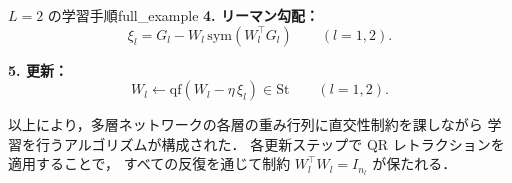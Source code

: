 \documentclass[uplatex, dvipdfmx]{jsarticle}
\begin{document}
\begin{example}{$L=2$ の学習手順}{full_example}
\textbf{4. リーマン勾配：}
\[
\xi_l = G_l - W_l\,\mathrm{sym}(W_l^\top G_l)
\qquad (l=1,2).
\]

\textbf{5. 更新：}
\[
W_l \gets \mathrm{qf}(W_l - \eta\,\xi_l)\in\mathrm{St}
\qquad (l=1,2).
\]
\end{example}

以上により，多層ネットワークの各層の重み行列に直交性制約を課しながら
学習を行うアルゴリズムが構成された．
各更新ステップで QR レトラクションを適用することで，
すべての反復を通じて制約 $W_l^\top W_l = I_{n_l}$ が保たれる．
\end{document}
